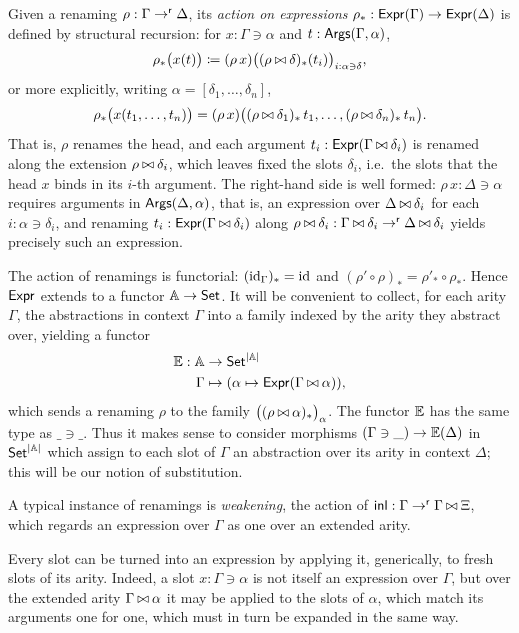 Given a renaming $\rho : \Gamma \to^{\mathsf{r}} \Delta$, its \emph{action on expressions} $\rho_* : \mathsf{Expr}(\Gamma) \to \mathsf{Expr}(\Delta)$ is defined by structural recursion: for $x : \Gamma \ni \alpha$ and $t : \mathsf{Args}(\Gamma, \alpha)$,
\[
\rho_*\big(x(t)\big) \coloneqq (\rho\, x)\big((\rho \mathbin{\bowtie} \delta)_*(t_i)\big)_{i : \alpha \ni \delta},
\]
or more explicitly, writing $\alpha = [\delta_1, \ldots, \delta_n]$,
\[
\rho_*\big(x(t_1, \ldots, t_n)\big) = (\rho\, x)\big((\rho \mathbin{\bowtie} \delta_1)_*\, t_1, \ldots, (\rho \mathbin{\bowtie} \delta_n)_*\, t_n\big).
\]
That is, $\rho$ renames the head, and each argument $t_i : \mathsf{Expr}(\Gamma \mathbin{\bowtie} \delta_i)$ is renamed along the extension $\rho \mathbin{\bowtie} \delta_i$, which leaves fixed the slots $\delta_i$, i.e.\ the slots that the head $x$ binds in its $i$-th argument.
The right-hand side is well formed: $\rho\, x : \Delta \ni \alpha$ requires arguments in $\mathsf{Args}(\Delta, \alpha)$, that is, an expression over $\Delta \mathbin{\bowtie} \delta_i$ for each $i : \alpha \ni \delta_i$, and renaming $t_i : \mathsf{Expr}(\Gamma \mathbin{\bowtie} \delta_i)$ along $\rho \mathbin{\bowtie} \delta_i : \Gamma \mathbin{\bowtie} \delta_i \to^{\mathsf{r}} \Delta \mathbin{\bowtie} \delta_i$ yields precisely such an expression.

The action of renamings is functorial: $(\mathrm{id}_\Gamma)_* = \mathrm{id}$ and $(\rho' \circ \rho)_* = \rho'_* \circ \rho_*$. Hence $\mathsf{Expr}$ extends to a functor $\mathbb{A} \to \mathsf{Set}$. It will be convenient to collect, for each arity $\Gamma$, the abstractions in context $\Gamma$ into a family indexed by the arity they abstract over, yielding a functor
\begin{align*}
    \mathbb{E} : \mathbb{A} &\to \mathsf{Set}^{\left| \mathbb{A} \right|}\\
    \Gamma &\mapsto (\alpha \mapsto \mathsf{Expr}(\Gamma \mathbin{\bowtie} \alpha)),
\end{align*}
which sends a renaming $\rho$ to the family $\big((\rho \mathbin{\bowtie} \alpha)_*\big)_{\alpha}$.
The functor $\mathbb{E}$ has the same type as $\_ \ni \_$. Thus it makes sense to consider morphisms $(\Gamma \ni \_) \to \mathbb{E}(\Delta)$ in $\mathsf{Set}^{\left|\mathbb{A}\right|}$ which assign to each slot of $\Gamma$ an abstraction over its arity in context $\Delta$; this will be our notion of substitution.

A typical instance of renamings is \emph{weakening}, the action of $\mathsf{inl} : \Gamma \to^{\mathsf{r}} \Gamma \mathbin{\bowtie} \Xi$, which regards an expression over $\Gamma$ as one over an extended arity.

Every slot can be turned into an expression by applying it, generically, to fresh slots of its arity. Indeed, a slot $x : \Gamma \ni \alpha$ is not itself an expression over $\Gamma$, but over the extended arity $\Gamma \mathbin{\bowtie} \alpha$ it may be applied to the slots of $\alpha$, which match its arguments one for one, which must in turn be expanded in the same way.

